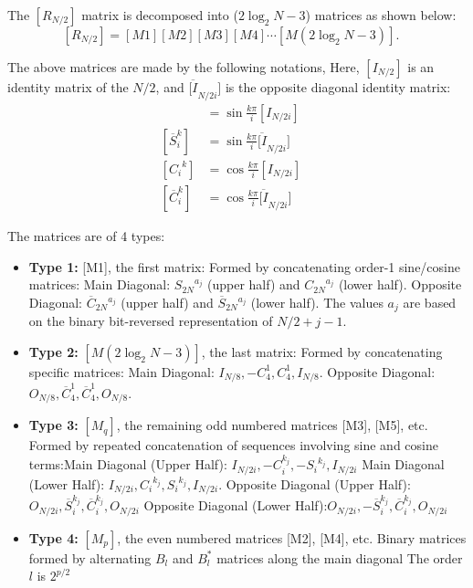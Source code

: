 \documentclass{article}
\begin{document}
The $[R_{N/2}]$ matrix is decomposed into ($2\log_{2}N-3$) matrices as shown below:
$$
[R_{N/2}]=[M1][M2][M3][M4]\cdots[M(2\log_{2}N-3)]. \quad
$$

The above matrices are made by the following notations, Here, $[I_{N/2}]$ is an identity matrix of the $N/2$, and $\overline{[I}_{N/2i}]$ is the opposite diagonal identity matrix:
\begin{align*}
 [{S_{i}}^{k}] &= \sin\frac{k\pi}{i}[I_{N/2i}] \quad  \\
 [\overline{S}_{i}^{k}] &= \sin\frac{k\pi}{i}\overline{[I}_{N/2i}] \quad \\
 [{C_{i}}^{k}] &= \cos\frac{k\pi}{i}[I_{N/2i}] \quad  \\
 [\overline{C}_{i}^{k}] &= \cos\frac{k\pi}{i}\overline{[I}_{N/2i}] \quad 
\end{align*}

The matrices are of 4 types:
\begin{itemize}
     \item \textbf{Type 1:} [M1], the first matrix: Formed by concatenating order-1 sine/cosine matrices: Main Diagonal: ${S_{2N}}^{a_{j}}$ (upper half) and ${C_{2N}}^{a_{j}}$ (lower half). Opposite Diagonal: $\overline{C}_{2N}{}^{a_{j}}$ (upper half) and $\overline{S}_{2N}{}^{a_{j}}$ (lower half). The values $a_j$ are based on the binary bit-reversed representation of $N/2+j-1$.
     \item \textbf{Type 2:} $[M(2\log_{2}N-3)]$, the last matrix: Formed by concatenating specific matrices: Main Diagonal: $I_{N/8}, -C_{4}^{1}, C_{4}^{1}, I_{N/8}$. Opposite Diagonal: $O_{N/8}, \overline{C}_{4}^{1}, \overline{C}_{4}^{1}, O_{N/8}$.
     \item \textbf{Type 3:} $[M_{q}]$, the remaining odd numbered matrices [M3], [M5], etc. Formed by repeated concatenation of sequences involving sine and cosine terms:Main Diagonal (Upper Half): $I_{N/2i}, -C_{i}^{k_{j}}, -{S_{i}}^{k_{j}}, I_{N/2i}$ Main Diagonal (Lower Half): $I_{N/2i}, {C_{i}}^{k_{j}}, {S_{i}}^{k_{j}}, I_{N/2i}$. Opposite Diagonal (Upper Half): $O_{N/2i}, \overline{S}_{i}^{k_{j}}, \overline{C}_{i}^{k_{j}}, O_{N/2i}$ Opposite Diagonal (Lower Half):$O_{N/2i}, -\overline{S}_{i}^{k_{j}}, \overline{C}_{i}^{k_{j}}, O_{N/2i}$ 
     \item \textbf{Type 4:} $[M_{p}]$, the even numbered matrices [M2], [M4], etc. Binary matrices formed by alternating $B_{l}$ and $B_{l}^{*}$ matrices along the main diagonal The order $l$ is $2^{p/2}$
\end{itemize}   
\end{document}
